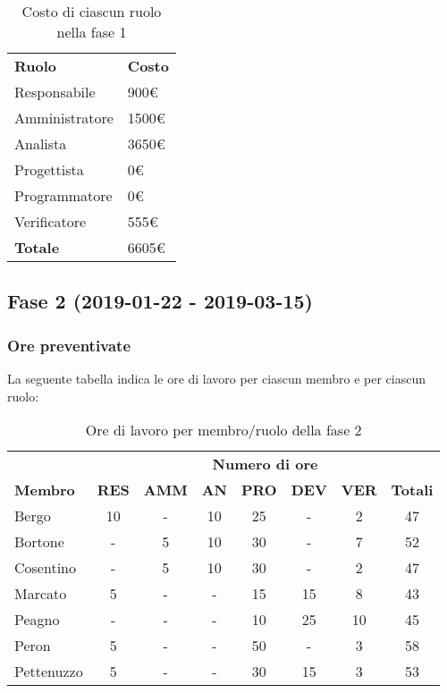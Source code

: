 		\begin{table}[h]
			\centering		
			\begin{tabular}{| l | l |}
				\rowcolor{LightBlue}
				\textbf{\color{white}Ruolo}
				& \textbf{\color{white}Costo}\\
			
				Responsabile 		& 900€\\
				Amministratore 	& 1500€\\
				Analista 				& 3650€\\			
				Progettista 			& 0€\\
				Programmatore 		& 0€\\
				Verificatore 		& 555€\\ \hline
				\textbf{Totale} 	& 6605€\\ \hline
			\end{tabular}
			\caption{Costo di ciascun ruolo nella fase 1}
		\end{table}

\newpage
\subsection{Fase 2 (2019-01-22 - 2019-03-15)}
	\subsubsection{Ore preventivate}
		La seguente tabella indica le ore di lavoro per ciascun membro e per ciascun ruolo:
		\begin{table}[h]
			\centering
			\begin{tabular}{| l | c c c c c c | c |}
				\rowcolor{LightBlue}
				& \multicolumn{7}{c}{\textbf{\color{white}Numero di ore}}	\\
	
				\rowcolor{LightBlue}
				\textbf{\color{white}Membro}
				& \textbf{\color{white}RES}
				& \textbf{\color{white}AMM}
				& \textbf{\color{white}AN}
				& \textbf{\color{white}PRO}
				& \textbf{\color{white}DEV}
				& \textbf{\color{white}VER}
				& \textbf{\color{white}Totali}\\

				Bergo      & 10 & - & 10 & 25 & - & 2 	& 47 \\
				Bortone    & - & 5 & 10 & 30 & - & 7 & 52 \\
				Cosentino  & - & 5 & 10 & 30 & - & 2 & 47 \\
				Marcato    & 5 & - & - & 15 & 15 & 8 & 43 \\
				Peagno     & - & - & - & 10 & 25 & 10 & 45 \\
				Peron      & 5 & - & - & 50 & - & 3 & 58 \\
				Pettenuzzo & 5 & - & - & 30 & 15 & 3 & 53 \\ \hline
			\end{tabular}
			\caption{Ore di lavoro per membro/ruolo della fase 2}
		\end{table}		
		
